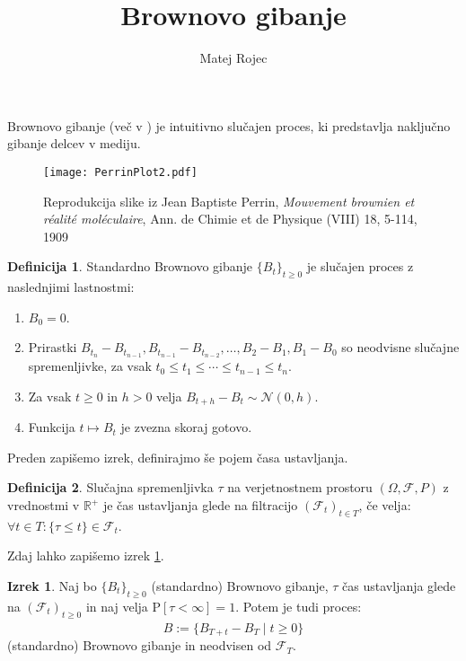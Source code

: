 \documentclass[11pt]{article}
\title{Brownovo gibanje}
\author{Matej Rojec}
\date{}
\theoremstyle{definition}
\newtheorem{definition}{Definicija}
\newtheorem{izrek}{Izrek}
\theoremstyle{plain}
\newcommand{\f}{\mathcal{F}}
\begin{document}
\maketitle
    

Brownovo gibanje (več v \cite{karatzas1991brownian}) je intuitivno slučajen proces, %
ki predstavlja naključno gibanje delcev v mediju.
    
\begin{figure}[ht!]
    \centering
    \texttt{[image: PerrinPlot2.pdf]}
    \caption{Reprodukcija slike iz Jean Baptiste Perrin, \emph{Mouvement brownien et réalité moléculaire}, Ann. de Chimie et de Physique (VIII) 18, 5-114, 1909}   
\end{figure}

    \begin{definition}
    Standardno Brownovo gibanje $\{B_t\}_{t \geq 0}$ je slučajen proces z naslednjimi lastnostmi: 
    \begin{enumerate}   
        \item $B_0 = 0$.
        \item Prirastki $B_{t_n} - B_{t_{n-1}}, B_{t_{n-1}} - B_{t_{n-2}}, \ldots, B_2 - B_1, B_1 - B_0$ so neodvisne slučajne spremenljivke, za vsak $t_0 \leq t_1 \leq \cdots \leq t_{n-1} \leq t_n$.
        \item Za vsak $t \geq 0$ in $h > 0$ velja $B_{t+h} - B_t \sim \mathcal{N}(0, h)$.
        \item Funkcija $t \mapsto B_t$ je zvezna skoraj gotovo.
    \end{enumerate}
\end{definition}

    Preden zapišemo izrek, definirajmo še pojem časa ustavljanja.
    
\begin{definition}  
    Slučajna spremenljivka $\tau$ na verjetnostnem prostoru $(\Omega,\f,P)$ z vrednostmi v $\mathbb{R}^+$ 
    je čas ustavljanja glede na filtracijo $(\f_t)_{t \in T}$, če velja: $\forall t \in T: \{\tau \leq t\} \in \f_t$.
\end{definition}

    Zdaj lahko zapišemo izrek \ref{thm:stopped_brownian}. %
    
\begin{izrek}
    \label{thm:stopped_brownian}   
    Naj bo $\{B_t\}_{t \geq 0}$ (standardno) Brownovo gibanje, $\tau$ čas ustavljanja glede na 
    $(\f_t)_{t \geq 0}$ in naj velja $\text{P}[\tau < \infty] = 1$.
    Potem je tudi proces:
    \[
    \hat{B} := \{B_{T+t} - B_T \mid t \geq 0\}
    \]
    (standardno) Brownovo gibanje in neodvisen od $\f_T$.
\end{izrek}
    


\end{document}
